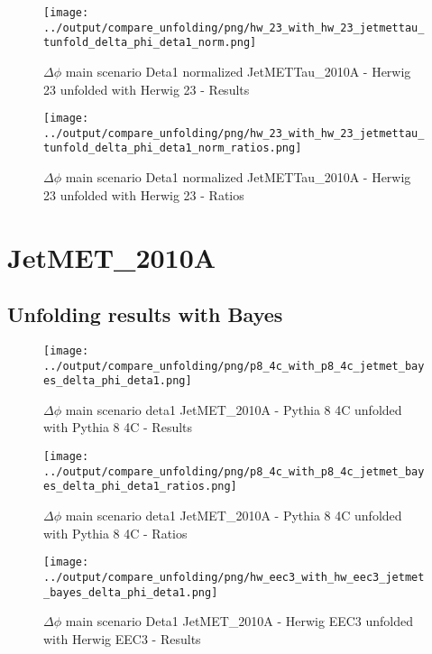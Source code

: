 \documentclass[11pt]{book}
\begin{document}
\begin{figure}[ht]
\centering
\texttt{[image: ../output/compare\_unfolding/png/hw\_23\_with\_hw\_23\_jetmettau\_tunfold\_delta\_phi\_deta1\_norm.png]}
\caption{$\Delta\phi$ main scenario Deta1 normalized JetMETTau\_2010A - Herwig 23 unfolded with Herwig 23 - Results}
\label{hw_23_hw_23_jetmettau_tunfold_delta_phi_deta1_norm_a}
\end{figure}

\begin{figure}[ht]
\centering
\texttt{[image: ../output/compare\_unfolding/png/hw\_23\_with\_hw\_23\_jetmettau\_tunfold\_delta\_phi\_deta1\_norm\_ratios.png]}
\caption{$\Delta\phi$ main scenario Deta1 normalized JetMETTau\_2010A - Herwig 23 unfolded with Herwig 23 - Ratios}
\label{hw_23_hw_23_jetmettau_tunfold_delta_phi_deta1_norm_b}
\end{figure}


\clearpage
\section{JetMET\_2010A}
\subsection{Unfolding results with Bayes}

\begin{figure}[ht]
\centering
\texttt{[image: ../output/compare\_unfolding/png/p8\_4c\_with\_p8\_4c\_jetmet\_bayes\_delta\_phi\_deta1.png]}
\caption{$\Delta\phi$ main scenario deta1 JetMET\_2010A - Pythia 8 4C unfolded with Pythia 8 4C - Results}
\label{p8_p8_jetmet_bayes_delta_phi_deta1_a}
\end{figure}

\begin{figure}[ht]
\centering
\texttt{[image: ../output/compare\_unfolding/png/p8\_4c\_with\_p8\_4c\_jetmet\_bayes\_delta\_phi\_deta1\_ratios.png]}
\caption{$\Delta\phi$ main scenario deta1 JetMET\_2010A - Pythia 8 4C unfolded with Pythia 8 4C - Ratios}
\label{p8_p8_jetmet_bayes_delta_phi_deta1_b}
\end{figure}

\begin{figure}[ht]
\centering
\texttt{[image: ../output/compare\_unfolding/png/hw\_eec3\_with\_hw\_eec3\_jetmet\_bayes\_delta\_phi\_deta1.png]}
\caption{$\Delta\phi$ main scenario Deta1 JetMET\_2010A - Herwig EEC3 unfolded with Herwig EEC3 - Results}
\label{hw_eec3_hw_eec3_jetmet_bayes_delta_phi_deta1_a}
\end{figure}
\end{document}
